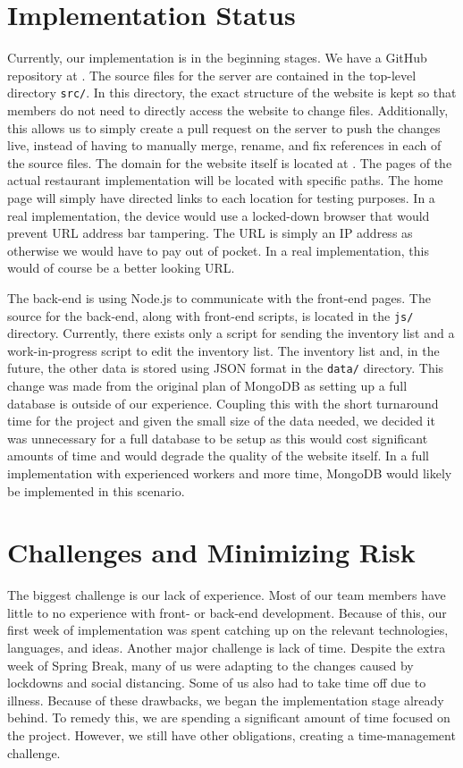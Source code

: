 \documentclass[12pt]{article}
\begin{document}
	\section{Implementation Status}
		Currently, our implementation is in the beginning stages. We have a GitHub repository at \cite{github}. The source files for the server are contained in the top-level directory \texttt{src/}. In this directory, the exact structure of the website is kept so that members do not need to directly access the website to change files. Additionally, this allows us to simply create a pull request on the server to push the changes live, instead of having to manually merge, rename, and fix references in each of the source files. The domain for the website itself is located at \cite{website}. The pages of the actual restaurant implementation will be located with specific paths. The home page will simply have directed links to each location for testing purposes. In a real implementation, the device would use a locked-down browser that would prevent URL address bar tampering. The URL is simply an IP address as otherwise we would have to pay out of pocket. In a real implementation, this would of course be a better looking URL.

		The back-end is using Node.js to communicate with the front-end pages. The source for the back-end, along with front-end scripts, is located in the \texttt{js/} directory. Currently, there exists only a script for sending the inventory list and a work-in-progress script to edit the inventory list. The inventory list and, in the future, the other data is stored using JSON format in the \texttt{data/} directory. This change was made from the original plan of MongoDB as setting up a full database is outside of our experience. Coupling this with the short turnaround time for the project and given the small size of the data needed, we decided it was unnecessary for a full database to be setup as this would cost significant amounts of time and would degrade the quality of the website itself. In a full implementation with experienced workers and more time, MongoDB would likely be implemented in this scenario.

	\section{Challenges and Minimizing Risk}
		The biggest challenge is our lack of experience. Most of our team members have little to no experience with front- or back-end development. Because of this, our first week of implementation was spent catching up on the relevant technologies, languages, and ideas. Another major challenge is lack of time. Despite the extra week of Spring Break, many of us were adapting to the changes caused by lockdowns and social distancing. Some of us also had to take time off due to illness. Because of these drawbacks, we began the implementation stage already behind. To remedy this, we are spending a significant amount of time focused on the project. However, we still have other obligations, creating a time-management challenge.
\end{document}
